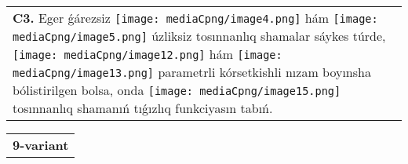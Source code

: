 \documentclass{article}
\begin{document}
\begin{tabular}{m{17cm}}
\textbf{C3.} Eger ǵárezsiz \texttt{[image: mediaCpng/image4.png]} hám \texttt{[image: mediaCpng/image5.png]} úzliksiz tosınnanlıq shamalar sáykes túrde, \texttt{[image: mediaCpng/image12.png]} hám \texttt{[image: mediaCpng/image13.png]} parametrli kórsetkishli nızam boyınsha bólistirilgen bolsa, onda \texttt{[image: mediaCpng/image15.png]} tosınnanlıq shamanıń tıǵızlıq funkciyasın tabıń.
 \\

\end{tabular}
\vspace{1cm}


\begin{tabular}{m{17cm}}
\textbf{9-variant}
\newline


\end{tabular}
\end{document}
